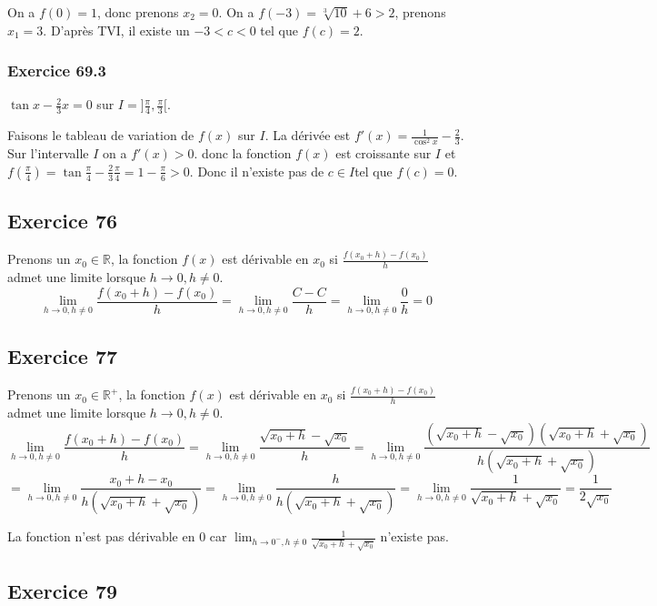 \documentclass[]{book}
\theoremstyle{definition}
\newcommand{\bb}[1]{\mathbb{#1}}
\newcommand{\R}{\bb{R}}
\begin{document}
On a $f(0) = 1$, donc prenons $x_2 = 0$. On a $f(-3) = \sqrt[3]{10} + 6 > 2$, prenons $x_1 = 3$. D'apr\`es TVI, il existe un $-3<c<0$ tel que $f(c) = 2$.

\subsubsection*{Exercice 69.3}
$\tan x - \frac{2}{3}x = 0$ sur $I = ]\frac{\pi}{4},\frac{\pi}{3}[$.

Faisons le tableau de variation de $f(x)$ sur $I$. La d\'eriv\'ee est $f'(x) = \frac{1}{\cos^2 x} - \frac{2}{3}$. Sur l'intervalle $I$ on a $f'(x) > 0$. donc la fonction $f(x)$ est croissante sur $I$ et $f(\frac{\pi}{4}) = \tan \frac{\pi}{4} - \frac{2}{3}\frac{\pi}{4} = 1 - \frac{\pi}{6} > 0$. Donc il n'existe pas de $c \in I$tel que $f(c) = 0$.  


\subsection*{Exercice 76}
Prenons un $x_0 \in \R$, la fonction $f(x)$ est d\'erivable en $x_0$ si $\frac{f(x_0+h)-f(x_0)}{h}$ admet une limite lorsque $h \to 0, h \neq 0$.
$$\lim_{h \to 0, h \neq 0} \frac{f(x_0+h)-f(x_0)}{h} = \lim_{h \to 0, h \neq 0} \frac{C-C}{h} = \lim_{h \to 0, h \neq 0} \frac{0}{h} = 0$$


\subsection*{Exercice 77}
Prenons un $x_0 \in \R^{+}$, la fonction $f(x)$ est d\'erivable en $x_0$ si $\frac{f(x_0+h)-f(x_0)}{h}$ admet une limite lorsque $h \to 0, h \neq 0$.
$$\lim_{h \to 0, h \neq 0} \frac{f(x_0+h)-f(x_0)}{h} = \lim_{h \to 0, h \neq 0} \frac{\sqrt{x_0+h}-\sqrt{x_0}}{h} = \lim_{h \to 0, h \neq 0} \frac{(\sqrt{x_0+h}-\sqrt{x_0})(\sqrt{x_0+h}+\sqrt{x_0})}{h(\sqrt{x_0+h}+\sqrt{x_0})}$$
$$= \lim_{h \to 0, h \neq 0} \frac{x_0+h-x_0}{h(\sqrt{x_0+h}+\sqrt{x_0})} = \lim_{h \to 0, h \neq 0} \frac{h}{h(\sqrt{x_0+h}+\sqrt{x_0})} = \lim_{h \to 0, h \neq 0} \frac{1}{\sqrt{x_0+h}+\sqrt{x_0}} = \frac{1}{2\sqrt{x_0}}$$

La fonction n'est pas d\'erivable en 0 car $\lim_{h \to 0^{-}, h \neq 0} \frac{1}{\sqrt{x_0+h}+\sqrt{x_0}}$ n'existe pas.\\


\subsection*{Exercice 79}
\end{document}
